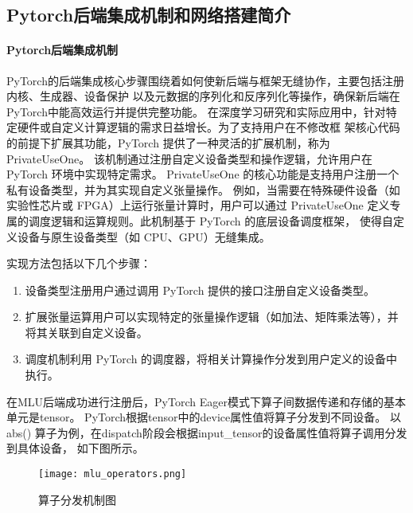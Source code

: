 \subsection{Pytorch后端集成机制和网络搭建简介}
\paragraph{Pytorch后端集成机制}

PyTorch的后端集成核心步骤围绕着如何使新后端与框架无缝协作，主要包括注册内核、生成器、设备保护
以及元数据的序列化和反序列化等操作，确保新后端在PyTorch中能高效运行并提供完整功能。
在深度学习研究和实际应用中，针对特定硬件或自定义计算逻辑的需求日益增长。为了支持用户在不修改框
架核心代码的前提下扩展其功能，PyTorch 提供了一种灵活的扩展机制，称为 PrivateUseOne。
该机制通过注册自定义设备类型和操作逻辑，允许用户在 PyTorch 环境中实现特定需求。
PrivateUseOne 的核心功能是支持用户注册一个私有设备类型，并为其实现自定义张量操作。
例如，当需要在特殊硬件设备（如实验性芯片或 FPGA）上运行张量计算时，用户可以通过 
PrivateUseOne 定义专属的调度逻辑和运算规则。此机制基于 PyTorch 的底层设备调度框架，
使得自定义设备与原生设备类型（如 CPU、GPU）无缝集成。

实现方法包括以下几个步骤：
\begin{enumerate}
    \item {设备类型注册}用户通过调用 PyTorch 提供的接口注册自定义设备类型。
    \item{扩展张量运算}用户可以实现特定的张量操作逻辑（如加法、矩阵乘法等），并将其关联到自定义设备。
    \item{调度机制}利用 PyTorch 的调度器，将相关计算操作分发到用户定义的设备中执行。
\end{enumerate}

在MLU后端成功进行注册后，PyTorch Eager模式下算子间数据传递和存储的基本单元是tensor。
PyTorch根据tensor中的device属性值将算子分发到不同设备。
以 abs() 算子为例，在dispatch阶段会根据input\_tensor的设备属性值将算子调用分发到具体设备，
如下图所示。

\begin{figure}
    \centering
    \texttt{[image: mlu\_operators.png]}
    \caption{算子分发机制图}
    \label{fig:mlu_operators}
\end{figure}

